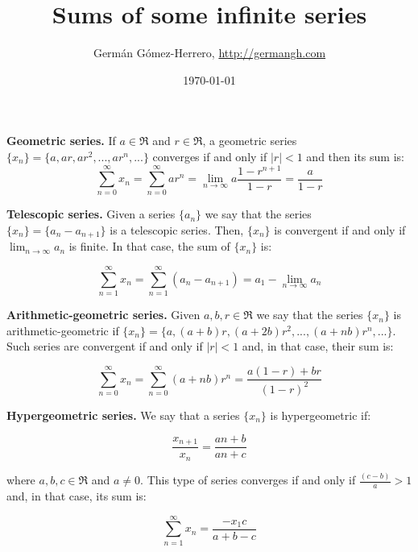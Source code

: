 \documentclass[a4paper,11pt,oneside]{article}
\title{Sums of some infinite series}
\author{Germ\'an G\'omez-Herrero, \url{http://germangh.com}}
\date{\today}
\begin{document}
\maketitle

\noindent\textbf{Geometric series.} If $a\in\Re$ and $r\in\Re$, a geometric series $\{x_{n}\} = \{a,ar,ar^2,...,ar^n,...\}$ converges if and only if $|r|<1$ and then its sum is:
\begin{equation} \sum_{n=0}^{\infty}x_{n}=\sum_{n=0}^{\infty}ar^{n}=\lim_{n\rightarrow\infty} a\frac{1-r^{n+1}}{1-r}=\frac{a}{1-r}
\end{equation}

\vspace{1cm}

\noindent\textbf{Telescopic series.} Given a series $\{a_{n}\}$ we say that the series $\{x_{n}\}=\{a_{n}-a_{n+1}\}$ is a telescopic series. Then, $\{x_{n}\}$ is convergent if and only if $\lim_{n\rightarrow\infty}a_{n}$ is finite. In that case, the sum of $\{x_{n}\}$ is:

\begin{equation}
\sum_{n=1}^{\infty}x_{n} = \sum_{n=1}^{\infty}\left(a_{n}-a_{n+1}\right)=a_1-\lim_{n\rightarrow\infty}a_{n}
\end{equation}

\vspace{1cm}

\noindent\textbf{Arithmetic-geometric series.} Given $a,b,r\in\Re$ we say that the series $\{x_{n}\}$ is arithmetic-geometric if $\{x_{n}\}=\{a,(a+b)r,(a+2b)r^2,...,(a+nb)r^n,...\}$. Such series are convergent if and only if $|r|<1$ and, in that case, their sum is:

\begin{equation}
\sum_{n=0}^{\infty}x_{n}=\sum_{n=0}^{\infty}(a+nb)r^n=\frac{a(1-r)+br}{(1-r)^2}
\end{equation}

\vspace{1cm}

\noindent\textbf{Hypergeometric series.} We say that a series $\{x_n\}$ is hypergeometric if:

\begin{equation}
\frac{x_{n+1}}{x_n}=\frac{an+b}{an+c}
\end{equation}

\noindent where $a,b,c\in\Re$ and $a\neq 0$. This type of series converges if and only if $\frac{(c-b)}{a}>1$ and, in that case, its sum is:

\begin{equation}
\sum_{n=1}^{\infty}x_{n}=\frac{-x_{1}c}{a+b-c}
\end{equation}
\end{document}
